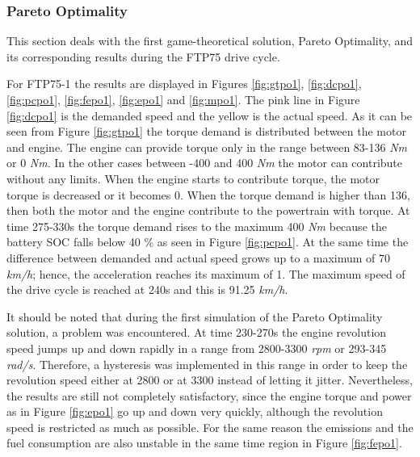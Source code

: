 \subsubsection{Pareto Optimality}
This section deals with the first game-theoretical solution, Pareto Optimality, and its corresponding results during the FTP75 drive cycle. 

For FTP75-1 the results are displayed in Figures \ref{fig:gtpo1}, \ref{fig:dcpo1}, \ref{fig:pcpo1}, \ref{fig:fepo1}, \ref{fig:epo1} and \ref{fig:mpo1}. The pink line in Figure \ref{fig:dcpo1} is the demanded speed and the yellow is the actual speed. As it can be seen from Figure \ref{fig:gtpo1} the torque demand is distributed between the motor and engine. The engine can provide torque only in the range between 83-136 \textit{Nm} or 0 \textit{Nm}. In the other cases between -400 and 400 \textit{Nm} the motor can contribute without any limits. When the engine starts to contribute torque, the motor torque is decreased or it becomes 0. When the torque demand is higher than 136, then both the motor and the engine contribute to the powertrain with torque. At time 275-330s the torque demand rises to the maximum 400 \textit{Nm} because the battery SOC falls below 40 \% as seen in Figure \ref{fig:pcpo1}. At the same time the difference between demanded and actual speed grows up to a maximum of 70 \textit{km/h}; hence, the acceleration reaches its maximum of 1. The maximum speed of the drive cycle is reached at 240s and this is 91.25 \textit{km/h}. 

It should be noted that during the first simulation of the Pareto Optimality solution, a problem was encountered. At time 230-270s the engine revolution speed jumps up and down rapidly in a range from 2800-3300 \textit{rpm} or 293-345 \textit{rad/s}. Therefore, a hysteresis was implemented in this range in order to keep the revolution speed either at 2800 or at 3300 instead of letting it jitter. Nevertheless, the results are still not completely satisfactory, since the engine torque and power as in Figure \ref{fig:epo1} go up and down very quickly, although the revolution speed is restricted as much as possible. For the same reason the emissions and the fuel consumption are also unstable in the same time region in Figure \ref{fig:fepo1}.


